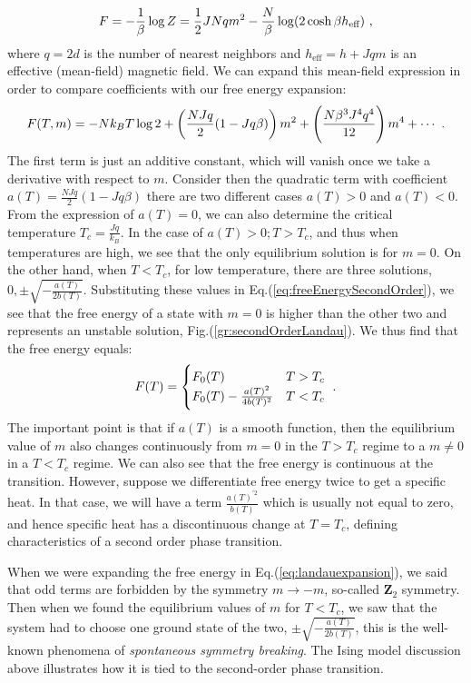 \begin{equation}
	F = -\frac{1}{\beta}\log Z = \frac{1}{2}JNqm^2 - \frac{N}{\beta}\log(2\cosh \beta h_{\text{eff}}) \ ,
\end{equation}
where $q=2d$ is the number of nearest neighbors and $h_{\text{eff}} = h + Jqm$ is an effective (mean-field) magnetic field. We can expand this mean-field expression in order to compare coefficients with our free energy expansion:
\begin{equation}
	F(T,m) = -Nk_BT\log 2 + \left( \frac{NJq}{2}(1-Jq\beta) \right)m^2 + \left( \frac{N\beta^3J^4q^4}{12} \right) m^4 + \cdots \ .
	\label{eq:freeEnergySecondOrder}
\end{equation}
The first term is just an additive constant, which will vanish once we take a derivative with respect to $m$. Consider then the quadratic term with coefficient $a(T)=\frac{NJq}{2}(1-Jq\beta)$ there are two different cases $a(T) > 0$ and $a(T) < 0$. From the expression of $a(T)=0$, we can also determine the critical temperature $T_c = \frac{Jq}{k_B}$. In the case of $a(T) > 0; T > T_c$, and thus when temperatures are high, we see that the only equilibrium solution is for $m=0$. On the other hand, when $T < T_c$, for low temperature, there are three solutions, $0, \pm \sqrt{-\frac{a(T)}{2b(T)}}$. Substituting these values in Eq.(\ref{eq:freeEnergySecondOrder}), we see that the free energy of a state with $m=0$ is higher than the other two and represents an unstable solution, Fig.(\ref{gr:secondOrderLandau}). We thus find that the free energy equals:
\begin{equation}
	F(T) = \begin{cases}
		F_0(T) & T > T_c \\
		F_0(T) - \frac{a(T)^2}{4b(T)^2} & T < T_c
	\end{cases} \ .
\end{equation}
The important point is that if $a(T)$ is a smooth function, then the equilibrium value of $m$ also changes continuously from $m=0$ in the $T>T_c$ regime to a $m\neq0$ in a $T<T_c$ regime. We can also see that the free energy is continuous at the transition. However, suppose we differentiate free energy twice to get a specific heat. In that case, we will have a term $\frac{a(T)^{\prime2}}{b(T)}$ which is usually not equal to zero, and hence specific heat has a discontinuous change at $T=T_c$, defining characteristics of a second order phase transition.
\par
When we were expanding the free energy in Eq.(\ref{eq:landauexpansion}), we said that odd terms are forbidden by the symmetry $m\rightarrow-m$, so-called $\mathbf{Z}_2$ symmetry. Then when we found the equilibrium values of $m$ for $T<T_c$, we saw that the system had to choose one ground state of the two, $\pm \sqrt{-\frac{a(T)}{2b(T)}}$, this is the well-known phenomena of \textit{spontaneous symmetry breaking}. The Ising model discussion above illustrates how it is tied to the second-order phase transition.

